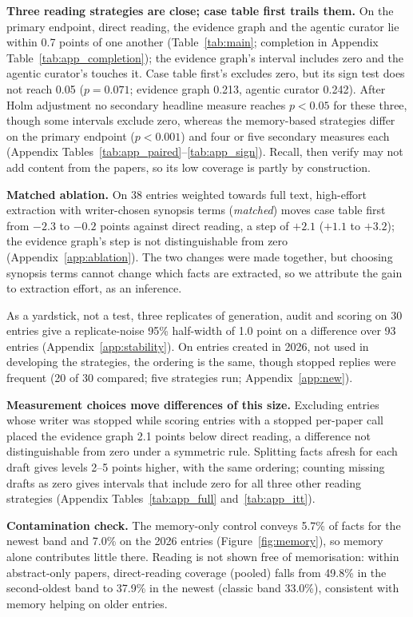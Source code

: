 \documentclass{article} %
\begin{document}
\textbf{Three reading strategies are close; case table first trails them.} On the primary endpoint, direct reading, the evidence graph and the agentic curator lie within 0.7 points of one another (Table~\ref{tab:main}; completion in Appendix Table~\ref{tab:app_completion}); the evidence graph's interval includes zero and the agentic curator's touches it. Case table first's excludes zero, but its sign test does not reach 0.05 ($p=0.071$; evidence graph 0.213, agentic curator 0.242). After Holm adjustment no secondary headline measure reaches $p<0.05$ for these three, though some intervals exclude zero, whereas the memory-based strategies differ on the primary endpoint ($p<0.001$) and four or five secondary measures each (Appendix Tables~\ref{tab:app_paired}--\ref{tab:app_sign}). Recall, then verify may not add content from the papers, so its low coverage is partly by construction.

\textbf{Matched ablation.}\label{sec:ablation} On 38 entries weighted towards full text, high-effort extraction with writer-chosen synopsis terms (\emph{matched}) moves case table first from $-2.3$ to $-0.2$ points against direct reading, a step of $+2.1$ ($+1.1$ to $+3.2$); the evidence graph's step is not distinguishable from zero (Appendix~\ref{app:ablation}). The two changes were made together, but choosing synopsis terms cannot change which facts are extracted, so we attribute the gain to extraction effort, as an inference.

As a yardstick, not a test, three replicates of generation, audit and scoring on 30 entries give a replicate-noise 95\% half-width of 1.0 point on a difference over 93 entries (Appendix~\ref{app:stability}). On entries created in 2026, not used in developing the strategies, the ordering is the same, though stopped replies were frequent (20 of 30 compared; five strategies run; Appendix~\ref{app:new}).

\textbf{Measurement choices move differences of this size.} Excluding entries whose writer was stopped while scoring entries with a stopped per-paper call placed the evidence graph 2.1 points below direct reading, a difference not distinguishable from zero under a symmetric rule. Splitting facts afresh for each draft gives levels 2--5 points higher, with the same ordering; counting missing drafts as zero gives intervals that include zero for all three other reading strategies (Appendix Tables~\ref{tab:app_full} and~\ref{tab:app_itt}).

\textbf{Contamination check.}\label{sec:memory} The memory-only control conveys 5.7\% of facts for the newest band and 7.0\% on the 2026 entries (Figure~\ref{fig:memory}), so memory alone contributes little there. Reading is not shown free of memorisation: within abstract-only papers, direct-reading coverage (pooled) falls from 49.8\% in the second-oldest band to 37.9\% in the newest (classic band 33.0\%), consistent with memory helping on older entries.
\end{document}
